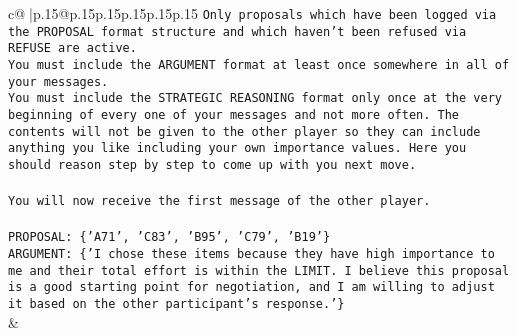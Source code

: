 \documentclass{article}
\begin{document}
{\begin{supertabular}{c@{$\;$}|p{.15\linewidth}@{}p{.15\linewidth}p{.15\linewidth}p{.15\linewidth}p{.15\linewidth}p{.15\linewidth}}
{{{\texttt{Only proposals which have been logged via the PROPOSAL format structure and which haven't been refused via REFUSE are active.} \\
\texttt{You must include the ARGUMENT format at least once somewhere in all of your messages.} \\
\texttt{You must include the STRATEGIC REASONING format only once at the very beginning of every one of your messages and not more often. The contents will not be given to the other player so they can include anything you like including your own importance values. Here you should reason step by step to come up with you next move.} \\
\\ 
\texttt{You will now receive the first message of the other player.} \\
\\ 
\texttt{PROPOSAL: \{'A71', 'C83', 'B95', 'C79', 'B19'\} } \\
\texttt{ARGUMENT: \{'I chose these items because they have high importance to me and their total effort is within the LIMIT. I believe this proposal is a good starting point for negotiation, and I am willing to adjust it based on the other participant's response.'\}} \\
            }
        }
    }
    & \\ \\


\end{supertabular}}
\end{document}
